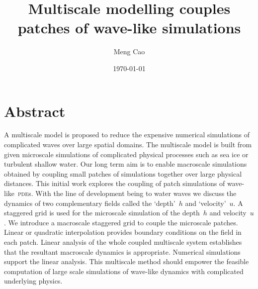 \documentclass[12pt,a5paper]{article}
\title{Multiscale modelling couples patches of wave-like simulations}
\author{Meng Cao}
\date{\today}
\begin{document}
\maketitle

\section*{Abstract}

A multiscale model is proposed to reduce the expensive numerical simulations of complicated waves over large spatial domains.
The multiscale model is built from given microscale simulations of complicated physical processes such as sea ice or turbulent shallow water. 
Our long term aim is to enable macroscale simulations obtained by coupling small patches of simulations together over large physical distances. 
This initial work explores the coupling of patch simulations of wave-like~\textsc{pde}s.
With the line of development being to water waves we discuss the dynamics of two complementary fields called the `depth'~$h$ and `velocity'~$u$.
A staggered grid is used for the microscale simulation of the depth~$h$ and velocity~$u$. 
We introduce a macroscale staggered grid to couple the microscale patches. 
Linear or quadratic interpolation provides boundary conditions on the field in each patch.
Linear analysis of the whole coupled multiscale system establishes that the resultant macroscale dynamics is appropriate.
Numerical simulations support the linear analysis.
This multiscale method should empower the feasible computation of large scale simulations of wave-like dynamics with complicated underlying physics.






















\end{document}
